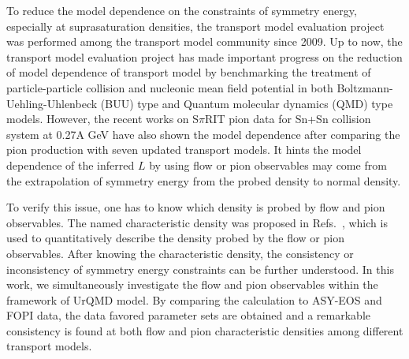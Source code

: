 \documentclass[reprint,aps,prc,twocolumn,superscriptaddress]{revtex4-1}
\begin{document}
To reduce the model dependence on the constraints of symmetry energy, especially at suprasaturation densities, the transport model evaluation project was performed among the transport model community since 2009. Up to now, the transport model evaluation project has made important progress on the reduction of model dependence of transport model by benchmarking the treatment of particle-particle collision\cite{YXZhang2018PRC,Akira2019PRC} and nucleonic mean field potential\cite{Maria2021PRC} in both Boltzmann-Uehling-Uhlenbeck (BUU) type and Quantum molecular dynamics (QMD) type models. However, the recent works on S$\pi$RIT pion data \cite{SpiRIT2021PRL} for Sn+Sn collision system at 0.27A GeV have also shown the model dependence after comparing the pion production with seven updated transport models. It hints the model dependence of the inferred $L$ by using flow or pion observables may come from the extrapolation of symmetry energy from the probed density to normal density. %

To verify this issue, one has to know which density is probed by flow and pion observables. The named characteristic density was proposed in Refs.~\cite{YYLiu2021PRC,Lynch2022PLB,Fevre2016NPA,YXZhang2020PRC}, which is used to quantitatively describe the density probed by the flow or pion observables. After knowing the characteristic density, the consistency or inconsistency of symmetry energy constraints can be further understood. %
In this work, we simultaneously investigate the flow and pion observables within the framework of UrQMD model. By comparing the calculation to ASY-EOS and FOPI data, the data favored parameter sets are obtained and a remarkable consistency is found at both flow and pion characteristic densities among different transport models. %
\end{document}
